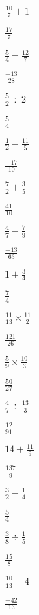 \documentclass[12pt]{exam}
\begin{document}
\begin{questions}
\begin{multicols}{2}
			\question $\frac{10}{7} + 1$
			\begin{solution}
				$\frac{17}{7}$
			\end{solution}

			\question $\frac{5}{4} - \frac{12}{7}$
			\begin{solution}
				$\frac{-13}{28}$
			\end{solution}

			\question $\frac{5}{2} \div 2$
			\begin{solution}
				$\frac{5}{4}$
			\end{solution}

			\question $\frac{1}{2} - \frac{11}{5}$
			\begin{solution}
				$\frac{-17}{10}$
			\end{solution}

			\question $\frac{7}{2} + \frac{3}{5}$
			\begin{solution}
				$\frac{41}{10}$
			\end{solution}

			\question $\frac{4}{7} - \frac{7}{9}$
			\begin{solution}
				$\frac{-13}{63}$
			\end{solution}

			\question $1 + \frac{3}{4}$
			\begin{solution}
				$\frac{7}{4}$
			\end{solution}

			\question $\frac{11}{13} \times \frac{11}{2}$
			\begin{solution}
				$\frac{121}{26}$
			\end{solution}

			\question $\frac{5}{9} \times \frac{10}{3}$
			\begin{solution}
				$\frac{50}{27}$
			\end{solution}

			\question $\frac{4}{7} \div \frac{13}{3}$
			\begin{solution}
				$\frac{12}{91}$
			\end{solution}

			\question $14 + \frac{11}{9}$
			\begin{solution}
				$\frac{137}{9}$
			\end{solution}

			\question $\frac{3}{2} - \frac{1}{4}$
			\begin{solution}
				$\frac{5}{4}$
			\end{solution}

			\question $\frac{3}{8} \div \frac{1}{5}$
			\begin{solution}
				$\frac{15}{8}$
			\end{solution}

			\question $\frac{10}{13} - 4$
			\begin{solution}
				$\frac{-42}{13}$
			\end{solution}


		\end{multicols}

\end{questions}
\end{document}
